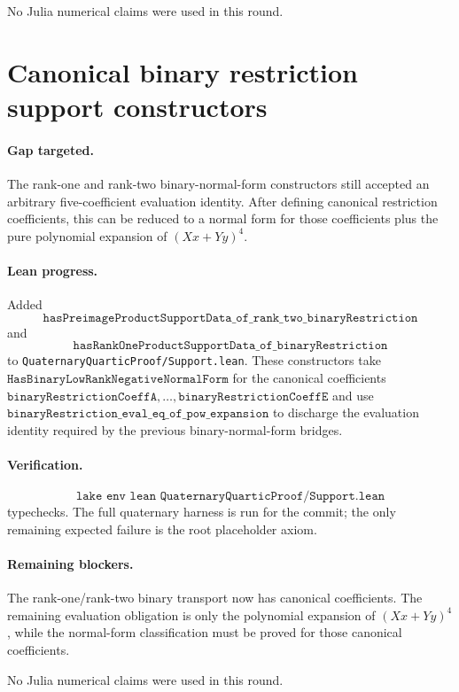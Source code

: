 \documentclass[11pt]{article}
\begin{document}
No Julia numerical claims were used in this round.

\section*{Canonical binary restriction support constructors}

\paragraph{Gap targeted.}
The rank-one and rank-two binary-normal-form constructors still accepted an
arbitrary five-coefficient evaluation identity.  After defining canonical
restriction coefficients, this can be reduced to a normal form for those
coefficients plus the pure polynomial expansion of \((Xx+Yy)^4\).

\paragraph{Lean progress.}
Added
\[
\texttt{hasPreimageProductSupportData\_of\_rank\_two\_binaryRestriction}
\]
and
\[
\texttt{hasRankOneProductSupportData\_of\_binaryRestriction}
\]
to \texttt{QuaternaryQuarticProof/Support.lean}.  These constructors take
\(\texttt{HasBinaryLowRankNegativeNormalForm}\) for the canonical coefficients
\(\texttt{binaryRestrictionCoeffA},\ldots,\texttt{binaryRestrictionCoeffE}\)
and use
\(\texttt{binaryRestriction\_eval\_eq\_of\_pow\_expansion}\) to discharge the
evaluation identity required by the previous binary-normal-form bridges.

\paragraph{Verification.}
\[
\texttt{lake env lean QuaternaryQuarticProof/Support.lean}
\]
typechecks.  The full quaternary harness is run for the commit; the only
remaining expected failure is the root placeholder axiom.

\paragraph{Remaining blockers.}
The rank-one/rank-two binary transport now has canonical coefficients.  The
remaining evaluation obligation is only the polynomial expansion of
\((Xx+Yy)^4\), while the normal-form classification must be proved for those
canonical coefficients.

No Julia numerical claims were used in this round.
\end{document}
